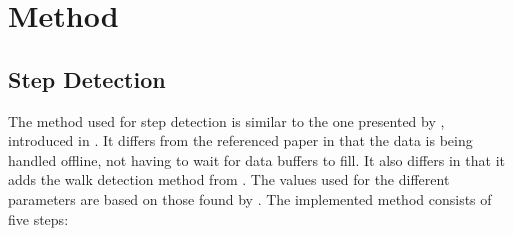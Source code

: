 \chapter{Method}

\section{Step Detection}
\label{sec:meth - step detection}
The method used for step detection is similar to the one presented by \cite{Salvi2018}, introduced in . It differs from the referenced paper in that the data is being handled offline, not having to wait for data buffers to fill. It also differs in that it adds the walk detection method from \cite{Brajdic2013}. The values used for the different parameters are based on those found by \cite{Salvi2018}. The implemented method consists of five steps:
